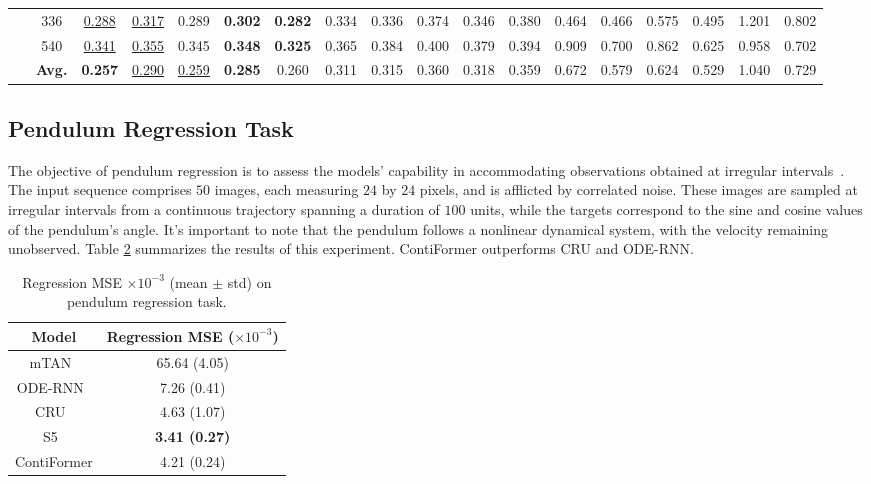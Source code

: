\begin{table}[t]
{\begin{tabular}{c|c|cccccccccccccccc}
        ~ & 336 & \underline{0.288}  & \underline{0.317}  & 0.289  & \textbf{0.302}  & \textbf{0.282}  & 0.334  & 0.336  & 0.374  & 0.346  & 0.380  & 0.464  & 0.466  & 0.575  & 0.495  & 1.201  & 0.802 \\ 
        ~ & 540 & \underline{0.341}  & \underline{0.355}  & 0.345  & \textbf{0.348}  & \textbf{0.325}  & 0.365  & 0.384  & 0.400  & 0.379  & 0.394  & 0.909  & 0.700  & 0.862  & 0.625  & 0.958  & 0.702 \\ 
        ~ & \textbf{Avg.} & \textbf{0.257}  & \underline{0.290}  & \underline{0.259}  & \textbf{0.285}  & 0.260  & 0.311  & 0.315  & 0.360  & 0.318  & 0.359  & 0.672  & 0.579  & 0.624  & 0.529  & 1.040  & 0.729 \\ 
    \bottomrule
    \end{tabular}}
    \vspace{-10pt}
    \label{tab:regular}
\end{table}

\subsection{Pendulum Regression Task} \label{sec:pendulum}

The objective of pendulum regression is to assess the models' capability in accommodating observations obtained at irregular intervals~\cite{schirmer2022modeling, smith2022simplified}. The input sequence comprises $50$ images, each measuring $24$ by $24$ pixels, and is afflicted by correlated noise. These images are sampled at irregular intervals from a continuous trajectory spanning a duration of $100$ units, while the targets correspond to the sine and cosine values of the pendulum's angle. It's important to note that the pendulum follows a nonlinear dynamical system, with the velocity remaining unobserved. Table \ref{tab:pendulum} summarizes the results of this experiment. ContiFormer outperforms CRU and ODE-RNN.

\begin{table}[htbp]
    \centering
    \caption{Regression MSE $\times 10^{-3}$ (mean $\pm$ std) on pendulum regression task.}
    \begin{tabular}{cc}
    \toprule
        Model & Regression MSE ($\times 10^{-3}$) \\
    \midrule
        mTAN~\cite{shukla2021multi} & 65.64 (4.05) \\
        ODE-RNN~\cite{rubanova2019latent} & 7.26 (0.41) \\
        CRU~\cite{schirmer2022modeling} & 4.63 (1.07) \\
        S5~\cite{smith2022simplified} & \textbf{3.41 (0.27)} \\
    \midrule
        ContiFormer & 4.21 (0.24) \\
    \bottomrule
    \end{tabular}
    \label{tab:pendulum}
\end{table}


